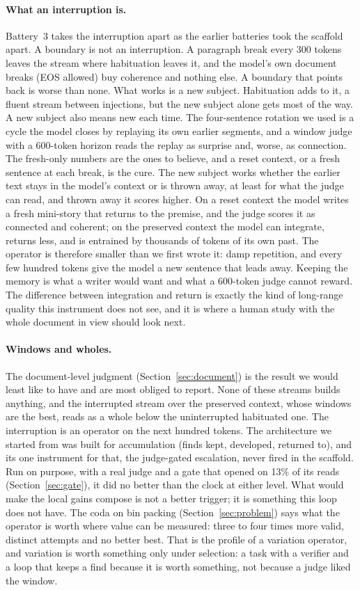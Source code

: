 \paragraph{What an interruption is.} Battery~3 takes the interruption apart
as the earlier batteries took the scaffold apart. A boundary is not an
interruption. A paragraph break every 300 tokens leaves the stream where
habituation leaves it, and the model's own document breaks (EOS allowed) buy
coherence and nothing else. A boundary that points back is worse than none.
What works is a new subject. Habituation adds to it, a fluent stream between
injections, but the new subject alone gets most of the way. A new subject
also means new each time. The four-sentence rotation we used is a cycle the
model closes by replaying its own earlier segments, and a window judge with
a 600-token horizon reads the replay as surprise and, worse, as connection.
The fresh-only numbers are the ones to believe, and a reset context, or a
fresh sentence at each break, is the cure. The new subject works whether the
earlier text stays in the model's context or is thrown away, at least for
what the judge can read, and thrown away it scores higher. On a reset
context the model writes a fresh mini-story that returns to the premise, and
the judge scores it as connected and coherent; on the preserved context the
model can integrate, returns less, and is entrained by thousands of tokens
of its own past. The operator is therefore smaller than we first wrote it:
damp repetition, and every few hundred tokens give the model a new sentence
that leads away. Keeping the memory is what a writer would want and what a
600-token judge cannot reward. The difference between integration and
return is exactly the kind of long-range quality this instrument does not
see, and it is where a human study with the whole document in view should
look next.

\paragraph{Windows and wholes.} The document-level judgment
(Section~\ref{sec:document}) is the result we would least like to have and
are most obliged to report. None of these streams builds anything, and the
interrupted stream over the preserved context, whose windows are the best,
reads as a whole below the uninterrupted habituated one. The interruption is
an operator on the next hundred tokens. The architecture we started from was
built for accumulation (finds kept, developed, returned to), and its one
instrument for that, the judge-gated escalation, never fired in the
scaffold. Run on purpose, with a real judge and a gate that opened on 13\% of
its reads (Section~\ref{sec:gate}), it did no better than the clock at
either level. What would make the local gains compose is not a better
trigger; it is something this loop does not have. The coda on bin packing
(Section~\ref{sec:problem}) says what the operator is worth where value can
be measured: three to four times more valid, distinct attempts and no better
best. That is the profile of a variation operator, and variation is worth
something only under selection: a task with a verifier and a loop that keeps
a find because it is worth something, not because a judge liked the window.


